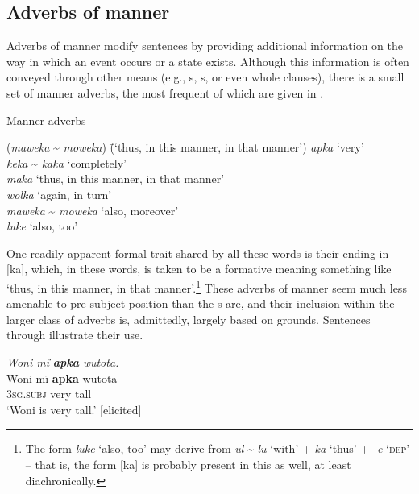 
\subsection{Adverbs of manner}\label{sec:8.2.3}


Adverbs of manner modify sentences by providing additional information on the way in which an event occurs or a state exists. Although this information is often conveyed through other means (e.g., s, s, or even whole clauses), there is a small set of manner adverbs, the most frequent of which are given in .

\ea%
\label{ex:otherwc:99}
Manner adverbs\\
\begin{tabbing}
{(\textit{maweka} {\textasciitilde} \textit{moweka})} \= {(‘thus, in this manner, in that manner’)}\kill
\textit{apka} \> ‘very’\\
\textit{keka} {\textasciitilde} \textit{kaka} \> ‘completely’\\
\textit{maka} \> ‘thus, in this manner, in that manner’\\
\textit{wolka} \> ‘again, in turn’\\
\textit{maweka} {\textasciitilde} \textit{moweka} \> ‘also, moreover’\\
\textit{luke} \> ‘also, too’
\end{tabbing}
\z
  
One readily apparent formal trait shared by all these words is their ending in [ka], which, in these words, is taken to be a formative meaning something like ‘thus, in this manner, in that manner’.\footnote{The form \textit{luke} ‘also, too’ may derive from \textit{ul} {\textasciitilde} \textit{lu} ‘with’ + \textit{ka} ‘thus’ + \textit{{}-e} ‘\textsc{dep}’ -- that is, the form [ka] is probably present in this  as well, at least diachronically.} These adverbs of manner seem much less amenable to pre-subject position than the s are, and their inclusion within the larger class of adverbs is, admittedly, largely based on  grounds. Sentences  through  illustrate their use.
  
  \ea%
    \label{ex:otherwc:100}
          \textit{Woni mï} \textbf{\textit{apka}} \textit{wutota.}\\
\gll    Woni  mï      \textbf{apka}  wutota\\
    [name]  3\textsc{sg.subj}  very  tall\\
\glt `Woni is very tall.’ [elicited]
\z

